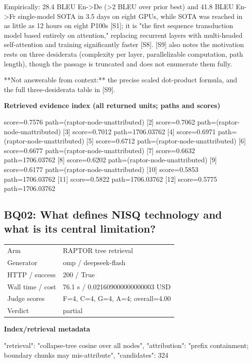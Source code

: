 \documentclass[10pt]{article}
\begin{document}
\begin{AnswerText}
Empirically: 28.4 BLEU En->De (>2 BLEU over prior best) and 41.8 BLEU En->Fr single-model SOTA in 3.5 days on eight GPUs, while SOTA was reached in as little as 12 hours on eight P100s [S1]; it is "the first sequence transduction model based entirely on attention," replacing recurrent layers with multi-headed self-attention and training significantly faster [S8]. [S9] also notes the motivation rests on three desiderata (complexity per layer, parallelizable computation, path length), though the passage is truncated and does not enumerate them fully.

**Not answerable from context:** the precise scaled dot-product formula, and the full three-desiderata table in [S9].
\end{AnswerText}

\textbf{Retrieved evidence index (all returned units; paths and scores) }
\begin{EvidenceText}
[1] score=0.7576 path=(raptor-node-unattributed)
[2] score=0.7062 path=(raptor-node-unattributed)
[3] score=0.7012 path=1706.03762
[4] score=0.6971 path=(raptor-node-unattributed)
[5] score=0.6712 path=(raptor-node-unattributed)
[6] score=0.6677 path=(raptor-node-unattributed)
[7] score=0.6632 path=1706.03762
[8] score=0.6202 path=(raptor-node-unattributed)
[9] score=0.6177 path=(raptor-node-unattributed)
[10] score=0.5853 path=1706.03762
[11] score=0.5822 path=1706.03762
[12] score=0.5775 path=1706.03762
\end{EvidenceText}
\subsection{BQ02: What defines NISQ technology and what is its central limitation?}
\begin{tabular}{@{}ll@{}}
Arm & RAPTOR tree retrieval\\
Generator & omp / deepseek-flash\\
HTTP / success & 200 / True\\
Wall time / cost & 76.1 s / 0.021609000000000003 USD\\
Judge scores & F=4, C=4, G=4, A=4; overall=4.00\\
Verdict & partial\\
\end{tabular}

\textbf{Index/retrieval metadata}
\begin{EvidenceText}
{
  "retrieval": "collapse-tree cosine over all nodes",
  "attribution": "prefix containment; boundary chunks may mis-attribute",
  "candidates": 324
}
\end{EvidenceText}
\end{document}
